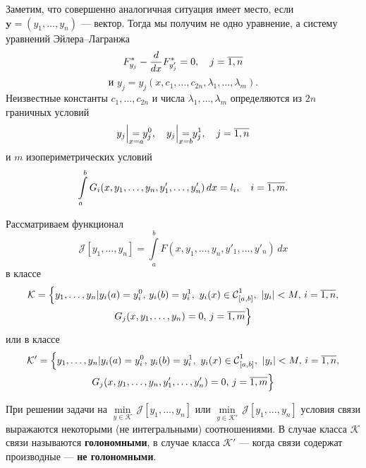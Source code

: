 \documentclass[12pt,a4paper,openany,fleqn]{book}
\newcommand{\Cf}{\ensuremath{\mathcal{C}}}
\newcommand{\J}{\ensuremath{\mathcal{J}}}
\newcommand{\mc}[1]{\ensuremath{\mathcal{#1}}}
\newcommand{\Cfn}[2][]{\ensuremath{\Cf{\mathstrut}^{#2}_{#1}}}
\newcommand{\der}[2]{\ensuremath{\frac{d#1}{d#2}}}
\newcommand{\K}{\mc{K}}
\theoremstyle{definition}
\begin{document}
\begin{enumerateD}
	Заметим, что совершенно аналогичная ситуация имеет место, если $\bm{y}=(y_1,\ldots,y_n)$ --- вектор. Тогда мы получим не одно уравнение, а систему уравнений Эйлера--Лагранжа
	\begin{equation*}
		 \hfill F^{\ast}_{y_j}-\der{}{x}F^{\ast}_{y'_j}=0,\quad j=\overline{1,n}\hfill
	\end{equation*}
	\begin{equation*}	
		\text{и }y_j=y_j(x,c_1,\ldots,c_{2n},\lambda_1,\ldots,\lambda_m).
	\end{equation*}
Неизвестные константы $c_1,\ldots,c_{2n}$ и числа $\lambda_1,\ldots,\lambda_m$ определяются из $2n$ граничных условий
\begin{equation*}
	\hfill y_j\Big|_{\lefteqn{\scriptstyle x=a}}=y_j^0,\quad y_j\Big|_{\lefteqn{\scriptstyle x=b}}=y_j^1,\quad j=\overline{1,n}\hfill
\end{equation*}
и $m$ изопериметрических условий
\begin{equation*}
	\hfill \int\limits_a^b G_i(x,y_1,\ldots,y_n,y'_1,\ldots,y'_n)\,dx=l_i,\quad i=\overline{1,m}.\hfill
\end{equation*}
\item Рассматриваем функционал 
\begin{equation*}
	\J[y_1,\ldots,y_n]=\int\limits_a^b F(x,y_1,\ldots,y_n,y'_1,\ldots,y'_n)\,dx
\end{equation*}
в классе 
\begin{multline*}
	\K=\Big\{y_1,\ldots,y_n|y_i(a)=y_i^0,\,y_i(b)=y_i^1,\ y_i(x)\in\Cfn[{[a,b]}]{1},\ |y_i|<M,\,i=\overline{1,n},\\ G_j(x,y_1,\ldots,y_n)=0,\,j=\overline{1,m}\Big\}
\end{multline*}
или в классе
\begin{multline*}
	\K'=\Big\{y_1,\ldots,y_n|y_i(a)=y_i^0,\,y_i(b)=y_i^1,\ y_i(x)\in\Cfn[{[a,b]}]{1},\ |y_i|<M,\,i=\overline{1,n},\\ G_j(x,y_1,\ldots,y_n,y'_1,\ldots,y'_n)=0,\,j=\overline{1,m}\Big\}
\end{multline*}

При решении задачи на $\min\limits_{y\in\K}\,\J[y_1,\ldots,y_n]$ или $\min\limits_{y\in\K'}\,\J[y_1,\ldots,y_n]$ условия связи выражаются некоторыми (не интегральными) соотношениями. В случае класса $\K$ связи называются \textbf{голономными}, в случае класса $\K'$ --- когда связи содержат производные --- \textbf{не голономными}.


\end{enumerateD}
\end{document}

